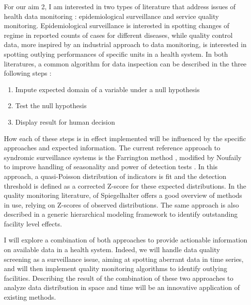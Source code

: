 For our aim 2, I am interested in two types of literature that address issues of health data monitoring :
epidemiological surveillance and service quality monitoring. Epidemiological surveillance is interested in spotting changes of regime in reported counts of cases for different diseases, while quality control data, more inspired by an industrial approach to data monitoring, is interested in spotting outlying performances of specific units in a health system. In both literatures, a common algorithm for data inspection can be described in the three following steps :
\begin{enumerate}
    \item Impute expected domain of a variable under a null hypothesis
    \item Test the null hypothesis
    \item Display result for human decision
\end{enumerate}

How each of these steps is in effect implemented will be influenced by the specific approaches and expected information. The current reference approach to syndromic surveillance systems is the Farrington method \cite{farrington_statistical_1996}, modified by Noufaily to improve handling of seasonality and power of detection tests \cite{noufaily_improved_2013,salmon_advances_2016}. In this approach, a quasi-Poisson distribution of indicators is fit and the detection threshold is defined as a corrected Z-score for these expected distributions. In the quality monitoring literature, of Spiegelhalter \cite{spiegelhalter_statistical_2012} offers a good overview of methods in use, relying on Z-scores of observed distributions. The same approach is also described in a generic hierarchical modeling framework to identify outstanding facility level effects\cite{ohlssen_hierarchical_2007,jones_improved_2012}.

I will explore a combination of both approaches to provide actionable information on available data in a health system. Indeed, we will handle data quality screening as a surveillance issue, aiming at spotting aberrant data in time series, and will then implement quality monitoring algorithms to identify outlying facilities. Describing the result of the combination of these two approaches to analyze data distribution in space and time will be an innovative application of existing methods.

